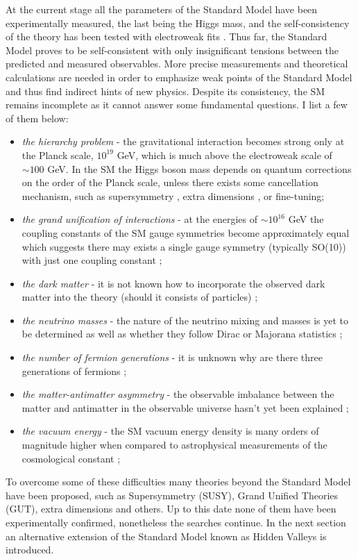 At the current stage all the parameters of the Standard Model have been experimentally measured,
the last being the Higgs mass, and the
self-consistency of the theory has been tested with electroweak fits \cite{Baak:2013ppa}.
Thus far, the Standard Model proves to be self-consistent with only insignificant tensions between
the predicted and measured observables. More precise measurements and theoretical calculations
are needed in order to emphasize weak points of the Standard Model and thus
find indirect hints of new physics.
Despite its consistency, the SM remains incomplete as it cannot answer some fundamental 
questions. I list a few of them below:
\begin{itemize}
 \item {\it the hierarchy problem} - the gravitational interaction becomes strong only at the 
Planck scale, $10^{19}$ GeV, which is much above the electroweak scale of $\sim 100$ GeV. 
In the SM the Higgs boson mass 
depends on quantum corrections on the order of the Planck scale, unless there
exists some cancellation mechanism, such as supersymmetry \cite{Martin:1997ns}, extra dimensions
\cite{ArkaniHamed:1998rs,Zee:2003mt}, or fine-tuning; 
 \item {\it the grand unification of interactions} - at the energies of $\sim 10^{16}$ GeV
the coupling constants of the SM gauge symmetries become approximately equal which suggests
there may exists a single gauge symmetry (typically SO(10)) with just one coupling constant
\cite{Georgi:1974sy,Buras197866};
 \item {\it the dark matter} - it is not known how to incorporate the observed
 dark matter into the theory (should it consists of particles) \cite{Bertone2005279};
 \item {\it the neutrino masses} - the nature of the neutrino mixing and masses is yet to be
determined as well as whether they follow Dirac or Majorana statistics \cite{Fukuda:1998fd};
 \item {\it the number of fermion generations} - it is unknown why are there three generations
of fermions \cite{Decamp:1989tu};
 \item {\it the matter-antimatter asymmetry} - the observable imbalance between the matter and
antimatter in the observable universe hasn't yet been explained \cite{Fukugita:1986hr};
 \item {\it the vacuum energy} - the SM vacuum
energy density is many orders of magnitude higher when compared to astrophysical measurements
of the cosmological constant \cite{Sahni:1999gb,Rugh2002663};
\end{itemize}
To overcome some of these difficulties many theories beyond the Standard Model have been
proposed, such as Supersymmetry (SUSY), Grand Unified Theories (GUT), extra dimensions and others.
Up to this date none of them have been experimentally confirmed, nonetheless the searches continue.
In the next section an alternative extension of the Standard Model known as Hidden Valleys 
is introduced. 

